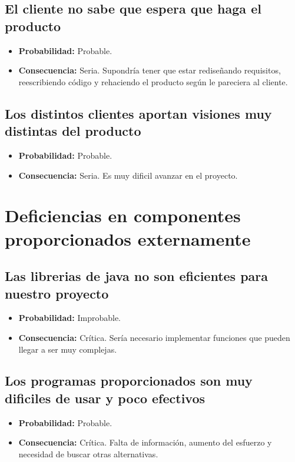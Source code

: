 \documentclass[spanish,a4paper,12pt]{report}	%
\begin{document}
\subsection*{El cliente no sabe que espera que haga el producto}	
	\begin{itemize}
		\item \textbf {Probabilidad: }Probable.

		\item \textbf {Consecuencia: }Seria. Supondría tener que estar rediseñando requisitos, reescribiendo código y rehaciendo el producto según le pareciera al cliente.
	\end{itemize}

\subsection*{Los distintos clientes aportan visiones muy distintas del producto}	
	\begin{itemize}
		\item \textbf {Probabilidad: }Probable.
		\item \textbf {Consecuencia: }Seria. Es muy dificil avanzar en el proyecto.
	\end{itemize}

%
\section{Deficiencias en componentes proporcionados externamente}

\subsection*{Las librerias de java no son eficientes para nuestro proyecto}	
	\begin{itemize}
		\item \textbf {Probabilidad: }Improbable.
		\item \textbf {Consecuencia: }Crítica. Sería necesario implementar funciones que pueden llegar a ser muy complejas.
	\end{itemize}

\subsection*{Los programas proporcionados son muy dificiles de usar y poco efectivos}	
	\begin{itemize}
		\item \textbf {Probabilidad: }Probable.
		\item \textbf {Consecuencia: }Crítica. Falta de información, aumento del esfuerzo y necesidad de buscar otras alternativas.
	\end{itemize}
\end{document}
